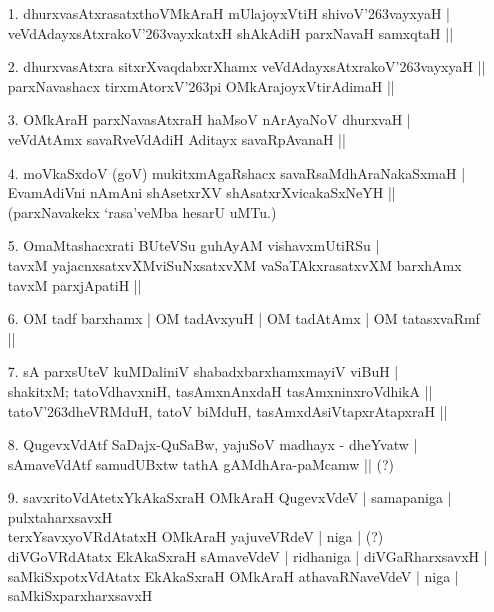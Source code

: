 \begin{itemize}
\item[1.] dhurxvasAtxrasatxthoVMkAraH mUlajoyxVtiH shivoV\char'263vayxyaH |\\
veVdAdayxsAtxrakoV\char'263vayxkatxH shAkAdiH parxNavaH samxqtaH ||
\item[2.] dhurxvasAtxra sitxrXvaqdabxrXhamx veVdAdayxsAtxrakoV\char'263vayxyaH ||\\
parxNavashacx tirxmAtorxV\char'263pi OMkArajoyxVtirAdimaH ||
\item[3.] OMkAraH parxNavasAtxraH haMsoV nArAyaNoV dhurxvaH |\\
veVdAtAmx savaRveVdAdiH Aditayx savaRpAvanaH ||
\item[4.] moVkaSxdoV (goV) mukitxmAgaRshacx savaRsaMdhAraNakaSxmaH |\\
EvamAdiVni nAmAni shAsetxrXV shAsatxrXvicakaSxNeYH ||\\
(parxNavakekx `rasa'veMba hesarU uMTu.)
\item[5.] OmaMtashacxrati BUteVSu guhAyAM vishavxmUtiRSu |\\
tavxM yajacnxsatxvXMviSuNxsatxvXM vaSaTAkxrasatxvXM barxhAmx tavxM parxjApatiH ||
\item[6.] OM tadf barxhamx | OM tadAvxyuH | OM tadAtAmx | OM tatasxvaRmf ||
\item[7.] sA parxsUteV kuMDaliniV shabadxbarxhamxmayiV viBuH |\\
shakitxM; tatoVdhavxniH, tasAmxnAnxdaH tasAmxninxroVdhikA ||\\
tatoV\char'263dheVRMduH, tatoV biMduH, tasAmxdAsiVtapxrAtapxraH ||
\item[8.] QugevxVdAtf SaDajx-QuSaBw, yajuSoV madhayx - dheYvatw |\\
sAmaveVdAtf samudUBxtw tathA gAMdhAra-paMcamw || (?)
\item[9.] savxritoVdAtetxYkAkaSxraH OMkAraH QugevxVdeV | samapaniga | pulxtaharxsavxH \\
terxYsavxyoVRdAtatxH OMkAraH yajuveVRdeV | niga | (?)\\
diVGoVRdAtatx EkAkaSxraH sAmaveVdeV | ridhaniga | diVGaRharxsavxH |\\
saMkiSxpotxVdAtatx EkAkaSxraH OMkAraH athavaRNaveVdeV | niga |\\
saMkiSxparxharxsavxH
\end{itemize}

